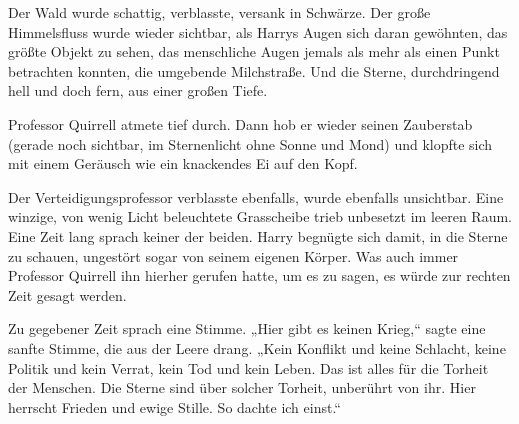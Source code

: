 
Der Wald wurde schattig, verblasste, versank in Schwärze. Der große Himmelsfluss wurde wieder sichtbar, als Harrys Augen sich daran gewöhnten, das größte Objekt zu sehen, das menschliche Augen jemals als mehr als einen Punkt betrachten konnten, die umgebende Milchstraße. Und die Sterne, durchdringend hell und doch fern, aus einer großen Tiefe.

Professor Quirrell atmete tief durch. Dann hob er wieder seinen Zauberstab (gerade noch sichtbar, im Sternenlicht ohne Sonne und Mond) und klopfte sich mit einem Geräusch wie ein knackendes Ei auf den Kopf.



Der Verteidigungsprofessor verblasste ebenfalls, wurde ebenfalls unsichtbar. Eine winzige, von wenig Licht beleuchtete Grasscheibe trieb unbesetzt im leeren Raum. Eine Zeit lang sprach keiner der beiden. Harry begnügte sich damit, in die Sterne zu schauen, ungestört sogar von seinem eigenen Körper. Was auch immer Professor Quirrell ihn hierher gerufen hatte, um es zu sagen, es würde zur rechten Zeit gesagt werden.


Zu gegebener Zeit sprach eine Stimme. „Hier gibt es keinen Krieg,“ sagte eine sanfte Stimme, die aus der Leere drang. „Kein Konflikt und keine Schlacht, keine Politik und kein Verrat, kein Tod und kein Leben. Das ist alles für die Torheit der Menschen. Die Sterne sind über solcher Torheit, unberührt von ihr. Hier herrscht Frieden und ewige Stille. So dachte ich einst.“

